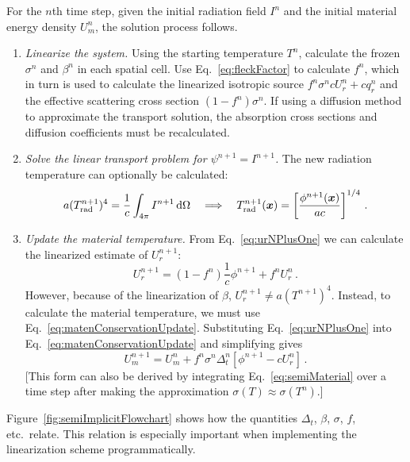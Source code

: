 For the $n$th time step, given the initial radiation field $I^{n}$ and the
initial material energy density $U_m^n$, the solution process follows.
\begin{enumerate}
  \item \emph{Linearize the system.} Using the starting temperature $T^n$,
    calculate
    the frozen $\sigma^n$ and $\beta^n$ in each spatial cell. Use
    Eq.~\eqref{eq:fleckFactor} to calculate $f^n$, which in turn is used to
    calculate the linearized isotropic source $f^n \sigma^n c U_r^n + c q_r^n$
    and the effective scattering cross section $\left(1 - f^n\right) \sigma^n$.
    If using a diffusion method to approximate the transport solution, the
    absorption cross sections and diffusion coefficients must be recalculated.

  \item \emph{Solve the linear transport problem for $\psi^{n+1}=I^{n+1}$.} The new
    radiation
    temperature can optionally be calculated:
    \begin{equation*}
      a (T_\text{rad}^{n+1})^4 = \frac{1}{c} \int_{4\pi} I^{n+1}
      \mathop{}\!\mathrm{d} \Omega
      \quad \Longrightarrow \quad
      T_\text{rad}^{n+1}(\bm{x})
      = \left[ \frac{\phi^{n+1}(\bm{x})}{ac} \right]^{1/4}\,.
    \end{equation*}

  \item \emph{Update the material temperature.} From Eq.~\eqref{eq:urNPlusOne}
    we can calculate the linearized estimate of $U_r^{n+1}$:
    \begin{equation*}
      U_r^{n+1} = \left(1 - f^n\right) \frac1c \phi^{n+1}  + f^n U_r^n\,.
    \end{equation*}
    However, because of the linearization of $\beta$, $U_r^{n+1} \ne a
    (T^{n+1})^4$. Instead, to calculate the material temperature, we must use
    Eq.~\eqref{eq:matenConservationUpdate}. Substituting
    Eq.~\eqref{eq:urNPlusOne} into Eq.~\eqref{eq:matenConservationUpdate}
    and simplifying gives
    \begin{equation}\label{eq:matenConservationUpdate2}
      U_m^{n+1} = U_m^n + f^n \sigma^n \Delta_t^n
      \left[ \phi^{n+1} - c U_r^n \right] \,.
    \end{equation}
    [This form can also be derived by integrating
    Eq.~\eqref{eq:semiMaterial} over a time step after making the
    approximation $\sigma(T) \approx \sigma(T^n)$.]
\end{enumerate}

Figure~\ref{fig:semiImplicitFlowchart} shows how the quantities $\Delta_t$,
$\beta$, $\sigma$, $f$, etc.~relate. This relation is especially important when
implementing the linearization scheme programmatically. 

